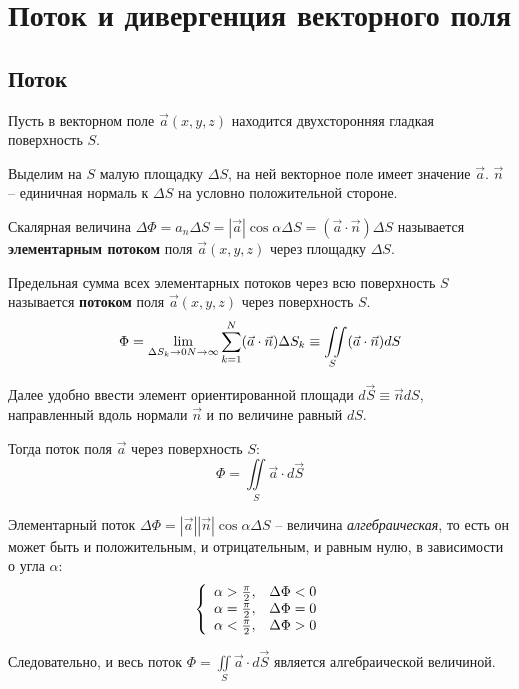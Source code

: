 \section{Поток и дивергенция векторного поля}

\subsection{Поток}

	Пусть в векторном поле \( \vec{a}(x, y, z) \)  находится двухсторонняя гладкая поверхность \( S \).
	
	Выделим на \( S \) малую площадку \( \Delta S \), на ней векторное поле имеет значение \( \vec{a} \). \( \vec{n} \) -- единичная нормаль к \( \Delta S \) на условно положительной стороне.
	
	\begin{definition}
	Скалярная величина \( \Delta\Phi = a_n\Delta S = |\vec{a}|\cos\alpha\Delta S = (\vec{a}\cdot\vec{n})\Delta S \) называется \textbf{элементарным потоком} поля \( \vec{a}(x, y, z) \) через площадку \( \Delta S \).
	\end{definition}
	
	\begin{definition}
	Предельная сумма всех элементарных потоков через всю поверхность \( S \) называется \textbf{потоком} поля \( \vec{a}(x, y, z) \) через поверхность \( S \).
	\begin{equation}
		\Phi = \lim_{\Delta S_k \to 0 \\ N \to \infty} \sum\limits_{k=1}^N (\vec{a}\cdot\vec{n})\Delta S_k \equiv \iint\limits_S (\vec{a}\cdot\vec{n})dS \label{eq4:1}
	\end{equation}
	\end{definition}
	
	Далее удобно ввести элемент ориентированной площади \( d\vec{S} \equiv \vec{n}dS \), направленный вдоль нормали \( \vec{n} \) и по величине равный \( dS \).
	
	Тогда поток поля \( \vec{a} \) через поверхность \( S \):
	\begin{equation}
		\Phi = \iint\limits_S \vec{a}\cdot d\vec{S} \label{eq4:2}
	\end{equation}
	
	\begin{remark}
	Элементарный поток \( \Delta \Phi = |\vec{a}| |\vec{n}|\cos\alpha\Delta S \)  -- величина \textit{алгебраическая}, то есть он может быть и положительным, и отрицательным, и равным нулю, в зависимости о угла \( \alpha \):
	\[ \left\{
	\begin{array}{r l}
		\alpha > \frac{\pi}{2}, & \Delta\Phi < 0 \\
		\alpha = \frac{\pi}{2}, & \Delta\Phi = 0 \\
		\alpha < \frac{\pi}{2}, & \Delta\Phi > 0
	\end{array}
	\right . \]
	
	Следовательно, и весь поток \( \Phi = \iint\limits_S \vec{a}\cdot d\vec{S} \) является алгебраической величиной.
	\end{remark}
	
